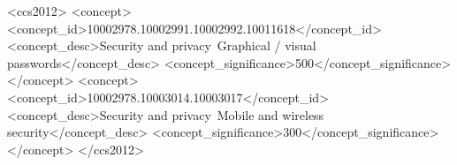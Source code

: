 \documentclass{sig-alternate-05-2015}
\begin{document}
\begin{CCSXML}
<ccs2012>
<concept>
<concept_id>10002978.10002991.10002992.10011618</concept_id>
<concept_desc>Security and privacy~Graphical / visual passwords</concept_desc>
<concept_significance>500</concept_significance>
</concept>
<concept>
<concept_id>10002978.10003014.10003017</concept_id>
<concept_desc>Security and privacy~Mobile and wireless security</concept_desc>
<concept_significance>300</concept_significance>
</concept>
</ccs2012>
\end{CCSXML}












\end{document}
